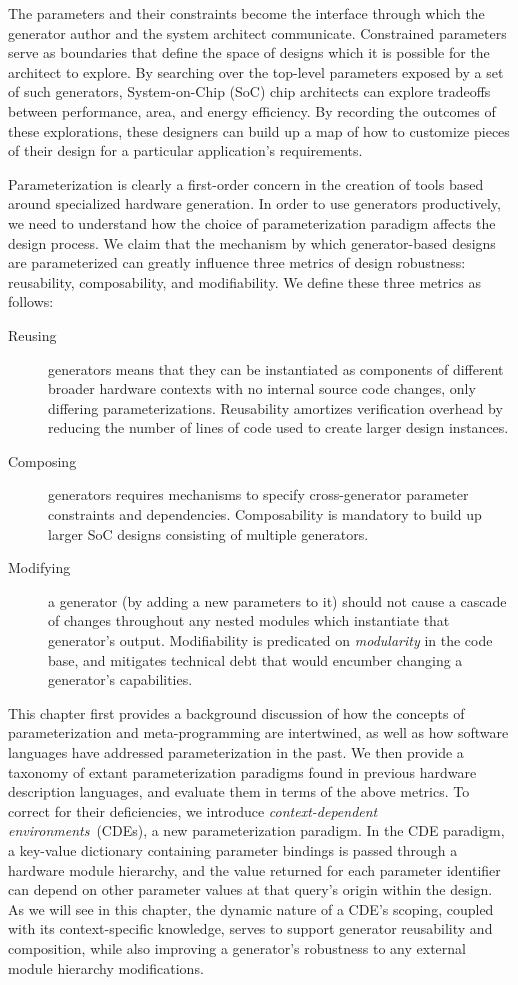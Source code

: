 The parameters and their constraints become the interface through which the generator author and the system architect communicate.
Constrained parameters serve as boundaries that define the space of designs which it is possible for the architect to explore.
By searching over the top-level parameters exposed by a set of such generators, System-on-Chip (SoC) chip architects can explore tradeoffs between performance, area, and energy efficiency.
By recording the outcomes of these explorations, these designers can build up a map of how to customize pieces of their design for a particular application's requirements.

Parameterization is clearly a first-order concern in the creation of tools based around specialized hardware generation.
In order to use generators productively, we need to understand how the choice of parameterization paradigm affects the design process.
We claim that the mechanism by which generator-based designs are parameterized can greatly influence three metrics of design robustness: reusability, composability, and modifiability.
We define these three metrics as follows:
\begin{description}
\item[Reusing] generators means that they can be instantiated as components of different broader hardware contexts with no internal source code changes, only differing parameterizations. Reusability amortizes verification overhead by reducing the number of lines of code used to create larger design instances.
\item[Composing] generators requires mechanisms to specify cross-generator parameter constraints and dependencies. Composability is mandatory to build up larger SoC designs consisting of multiple generators.
\item[Modifying] a generator (by adding a new parameters to it) should not cause a cascade of changes throughout any nested modules which instantiate that generator's output. Modifiability is predicated on \emph{modularity} in the code base, and mitigates technical debt that would encumber changing a generator's capabilities.
\end{description}

This chapter first provides a background discussion of how the concepts of parameterization and meta-programming are intertwined, as well as how software languages have addressed parameterization in the past.
We then provide a taxonomy of extant parameterization paradigms found in previous hardware description languages, and evaluate them in terms of the above metrics.
To correct for their deficiencies, we introduce \emph{context-dependent environments}~(CDEs), a new parameterization paradigm.
In the CDE paradigm, a key-value dictionary containing parameter bindings is passed through a hardware module hierarchy, and the value returned for each parameter identifier can depend on other parameter values at that query's origin within the design.
As we will see in this chapter,
the dynamic nature of a CDE's scoping, coupled with its context-specific knowledge, 
serves to support generator reusability and composition, while also improving a generator's robustness to any external module hierarchy modifications.

